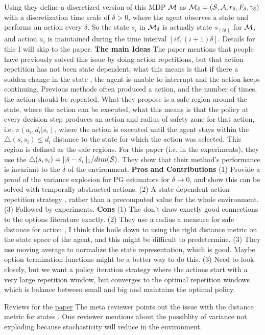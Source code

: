\documentclass[11pt]{article}
\begin{document}
Using \cite{tallec2019making} they define a discretized version of this MDP $\M$ as $\M_\delta = (\S, \A, r_\delta, F_\delta, \gamma_\delta)$ with a discretization time scale of $\delta > 0$, where the agent observes a state and performs an action every $\delta$. So the state $s_i$ in $\M_\delta$ is actually state $s_(i\delta)$ for $\M$, and action $a_i$ is maintained during the time interval $[i\delta, (i+1)\delta]$. Details for this I will skip to the paper. 
\textbf{The main Ideas} The paper mentions that people have previously solved this issue by doing action repetitions, but that action repetition has not been state dependent, what this means is that if there a sudden change in the state , the agent is unable to interrupt and the action keeps continuing. Previous methods often produced a action, and the number of times, the action should be repeated. 
What they propose is a safe region around the state, where the action can be executed, what this means is that the policy at every decision step produces an action and radius of safety zone for that action, i.e. $\pi(a_i,d_i | s_i)$, where the action is executed until the agent stays within the $\triangle(s, s_i) \leq d_i$ distance to the state for which the action was selected. This region is defined as the safe regions. For this paper (i.e. in the experiments), they use the $\triangle(s, s_i) = \| \tilde{s} - \tilde{s_i} \|_1 / dim(\S)$.  They show that their method's performance is invariant to the $\delta$ of the environment.
\textbf{Pros and Contributions} (1) Provide a proof of the variance explosion for PG estimators for $\delta \rightarrow 0$, and show this can be solved with temporally abstracted actions. (2) A state dependent action repetition strategy , rather than a precomputed value for the whole environment. (3) Followed by experiments. 
\textbf{Cons} (1) The don't draw exactly good connections to the options literature exactly. (2) They use a radius a measure for safe distance for action , I think this boils down to using the right distance metric on the state space of the agent, and this might be difficult to predetermine. (3) They use moving average to normalize the state representation, which is good. Maybe option termination functions might be a better way to do this. (3) Need to look closely, but we want a policy iteration strategy where the actions start with a very large repetition window, but converges to the optimal repetition windows which is balance between small and big and maintains the optimal policy. 

Reviews for the \hyperlink{https://openreview.net/forum?id=xNmhYNQruJX}{paper}
The meta reviewer points out the issue with the distance metric for states . 
One reviewer mentions about the possiblity of variance not exploding because stochasticity will reduce in the environment. 
\end{document}
